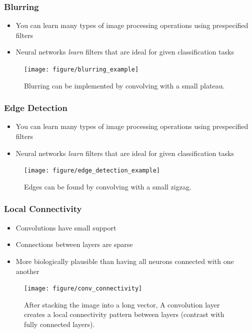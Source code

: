 \documentclass[10pt,mathserif]{beamer}
\begin{document}

\begin{frame}
  \frametitle{Blurring}
  \begin{itemize}
    \item You can learn many types of image processing operations using
      prespecified filters
    \item Neural networks \textit{learn} filters that are ideal for given
      classification tasks
  \end{itemize}
  \begin{figure}[ht]
    \centering
    \texttt{[image: figure/blurring\_example]}
    \caption{Blurring can be implemented by convolving with a small
      plateau. \label{fig:blurring_example} }
  \end{figure}
\end{frame}

\begin{frame}
  \frametitle{Edge Detection}
  \begin{itemize}
    \item You can learn many types of image processing operations using
      prespecified filters
    \item Neural networks \textit{learn} filters that are ideal for given
      classification tasks
  \end{itemize}
  \begin{figure}[ht]
    \centering
    \texttt{[image: figure/edge\_detection\_example]}
    \caption{Edges can be found by convolving with a small
      zigzag. \label{fig:edges_example} }
  \end{figure}
\end{frame}

\begin{frame}
  \frametitle{Local Connectivity}
  \begin{itemize}
  \item Convolutions have small support
  \item Connections between layers are sparse
  \item More biologically plausible than having all neurons connected with one
    another
  \end{itemize}
  \begin{figure}[ht]
    \centering
    \texttt{[image: figure/conv\_connectivity]}
    \caption{After stacking the image into a long vector, A convolution layer
      creates a local connectivity pattern between layers (contrast with fully
      connected layers). \label{fig:conv_connectivity} }
  \end{figure}
\end{frame}
\end{document}

